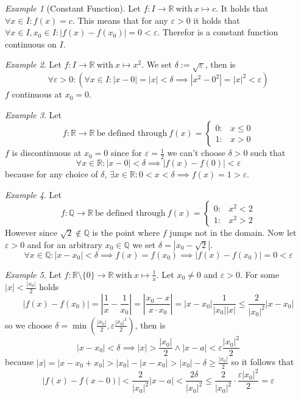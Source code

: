 \documentclass[english,titlepage]{uzhpub}
\theoremstyle{definition}
\theoremstyle{plain}
\theoremstyle{remark}
\theoremstyle{example}
\newtheorem*{example}{Example}
\begin{document}
   \begin{example}[Constant Function]
      Let \(f: I \to \mathbb{R}~\text{with}~x \mapsto c\).
      It holds that \(\forall x \in I: f(x) = c\).
      This means that for any \(\varepsilon > 0\) it holds that \(\forall x \in I, x_0 \in I: |f(x) - f(x_0)| = 0 < \varepsilon\).
      Therefor is a constant function continuous on \(I\).
   \end{example}
   \begin{example}
      Let \(f: I \to \mathbb{R}~\text{with}~x \mapsto x^2\).
      We set \(\delta := \sqrt\varepsilon\), then is
      \[\forall \varepsilon > 0: (\forall x \in I: |x - 0| = |x| < \delta \implies |x^2 - 0^2| = |x|^2 < \varepsilon)\]
      \(f\) continuous at \(x_0 = 0\).
   \end{example}
   \begin{example}
      Let
      \[f: \mathbb{R} \to \mathbb{R}~\text{be defined through}~f(x) = \begin{cases}0: & x \leq 0\\ 1: & x > 0\end{cases}\]
      \(f\) is discontinuous at \(x_0 = 0\) since for \(\varepsilon = \frac{1}{2}\) we can't choose \(\delta > 0\) such that
      \[\forall x \in \mathbb{R}: |x - 0| < \delta \implies |f(x) - f(0)| < \varepsilon\]
      because for any choice of \(\delta\), \(\exists x \in \mathbb{R}: 0 < x < \delta \implies f(x) = 1 > \varepsilon\).
   \end{example}
   \begin{example}
      Let
      \[f: \mathbb{Q} \to \mathbb{R}~\text{be defined through}~f(x) = \begin{cases}0: & x^2 < 2\\ 1: & x^2 > 2\end{cases}\]
      However since \(\sqrt{2} \not\in \mathbb{Q}\) is the point where \(f\) jumps not in the domain.
      Now let \(\varepsilon > 0\) and for an arbitrary \(x_0 \in \mathbb{Q}\) we set \(\delta = |x_0 - \sqrt{2}|\).
      \[\forall x \in \mathbb{Q}: |x - x_0| < \delta \implies f(x) = f(x_0) \implies |f(x) - f(x_0)| = 0 < \varepsilon\]
   \end{example}
   \begin{example}
      Let \(f: \mathbb{R} \setminus \{0\} \to \mathbb{R}~\text{with}~x \mapsto \frac{1}{x}\).
      Let \(x_0 \neq 0\) and \(\varepsilon > 0\).
      For some \(|x| < \frac{|x_0|}{2}\) holds
      \[|f(x) - f(x_0)| = \left|\frac{1}{x} - \frac{1}{x_0}\right| = \left|\frac{x_0-x}{x \cdot x_0}\right| = |x-x_0| \frac{1}{|x_0||x|} \leq \frac{2}{|x_0|^2} |x-x_0|\]
      so we choose \(\delta = \min\left(\frac{|x_0|}{2}, \varepsilon \frac{|x_0|^2}{2}\right)\), then is
      \[|x-x_0| < \delta \implies |x| > \frac{|x_0|}{2} \land |x-a| < \varepsilon \frac{|x_0|^2}{2}\]
      because \(|x| = |x-x_0+x_0| > |x_0| - |x-x_0| > |x_0| - \delta \geq \frac{|x_0|}{2}\) so it follows that
      \[|f(x) - f(x-0)| < \frac{2}{|x_0|^2} |x-a| < \frac{2\delta}{|x_0|^2} \leq \frac{2}{|x_0|^2} \cdot \frac{\varepsilon|x_0|^2}{2} = \varepsilon\]
   \end{example}
\end{document}
